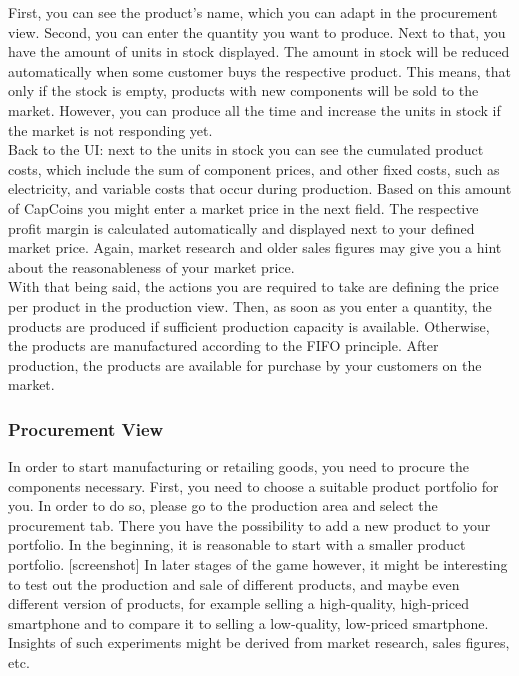 First, you can see the product’s name, which you can adapt in the procurement view. Second, you can enter the quantity you want to produce. Next to that, you have the amount of units in stock displayed. The amount in stock will be reduced automatically when some customer buys the respective product. This means, that only if the stock is empty, products with new components will be sold to the market. However, you can produce all the time and increase the units in stock if the market is not responding yet. \\
Back to the UI: next to the units in stock you can see the cumulated product costs, which include the sum of component prices, and other fixed costs, such as electricity, and variable costs that occur during production. Based on this amount of CapCoins you might enter a market price in the next field. The respective profit margin is calculated automatically and displayed next to your defined market price. Again, market research and older sales figures may give you a hint about the reasonableness of your market price. \\
With that being said, the actions you are required to take are defining the price per product in the production view. Then, as soon as you enter a quantity, the products are produced if sufficient production capacity is available. Otherwise, the products are manufactured according to the FIFO principle. After production, the products are available for purchase by your customers on the market.

\subsubsection{Procurement View}
\label{sub:ProcurementView}
In order to start manufacturing or retailing goods, you need to procure the components necessary. First, you need to choose a suitable product portfolio for you. In order to do so, please go to the production area and select the procurement tab. There you have the possibility to add a new product to your portfolio. In the beginning, it is reasonable to start with a smaller product portfolio. [screenshot] In later stages of the game however, it might be interesting to test out the production and sale of different products, and maybe even different version of products, for example selling a high-quality, high-priced smartphone and to compare it to selling a low-quality, low-priced smartphone. Insights of such experiments might be derived from market research, sales figures, etc.

